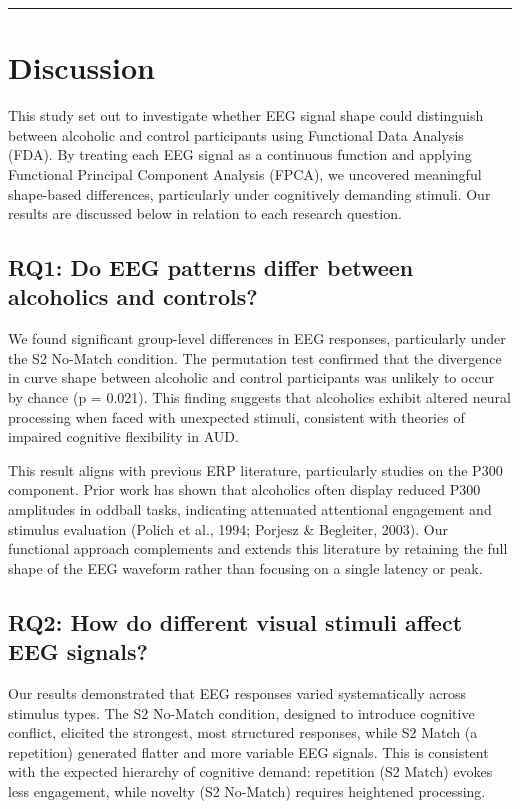 \documentclass{article}
\begin{document}
\begin{center}\rule{0.5\linewidth}{0.5pt}\end{center}

\section{Discussion}\label{discussion}

This study set out to investigate whether EEG signal shape could
distinguish between alcoholic and control participants using Functional
Data Analysis (FDA). By treating each EEG signal as a continuous
function and applying Functional Principal Component Analysis (FPCA), we
uncovered meaningful shape-based differences, particularly under
cognitively demanding stimuli. Our results are discussed below in
relation to each research question.

\subsection{RQ1: Do EEG patterns differ between alcoholics and
controls?}\label{rq1-do-eeg-patterns-differ-between-alcoholics-and-controls}

We found significant group-level differences in EEG responses,
particularly under the S2 No-Match condition. The permutation test
confirmed that the divergence in curve shape between alcoholic and
control participants was unlikely to occur by chance (p = 0.021). This
finding suggests that alcoholics exhibit altered neural processing when
faced with unexpected stimuli, consistent with theories of impaired
cognitive flexibility in AUD.

This result aligns with previous ERP literature, particularly studies on
the P300 component. Prior work has shown that alcoholics often display
reduced P300 amplitudes in oddball tasks, indicating attenuated
attentional engagement and stimulus evaluation (Polich et al., 1994;
Porjesz \& Begleiter, 2003). Our functional approach complements and
extends this literature by retaining the full shape of the EEG waveform
rather than focusing on a single latency or peak.

\subsection{RQ2: How do different visual stimuli affect EEG
signals?}\label{rq2-how-do-different-visual-stimuli-affect-eeg-signals-1}

Our results demonstrated that EEG responses varied systematically across
stimulus types. The S2 No-Match condition, designed to introduce
cognitive conflict, elicited the strongest, most structured responses,
while S2 Match (a repetition) generated flatter and more variable EEG
signals. This is consistent with the expected hierarchy of cognitive
demand: repetition (S2 Match) evokes less engagement, while novelty (S2
No-Match) requires heightened processing.
\end{document}
